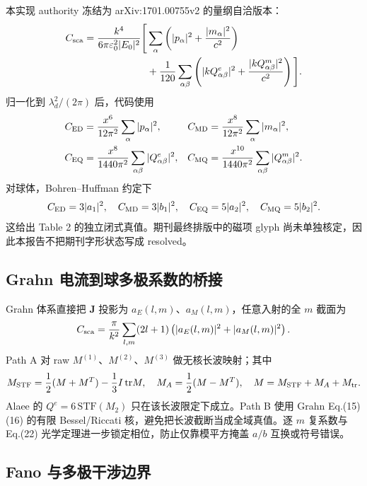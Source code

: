 本实现 authority 冻结为 arXiv:1701.00755v2 的量纲自洽版本：
\begin{equation}
\begin{aligned}
C_{\rm sca}=\frac{k^4}{6\pi\varepsilon_0^2|E_0|^2}\Bigg[&\sum_\alpha\left(|p_\alpha|^2+\frac{|m_\alpha|^2}{c^2}\right)\\
&+\frac{1}{120}\sum_{\alpha\beta}\left(|kQ^e_{\alpha\beta}|^2+\frac{|kQ^m_{\alpha\beta}|^2}{c^2}\right)\Bigg].
\end{aligned}
\label{eq:alaee1}
\end{equation}
归一化到 $\lambda_d^2/(2\pi)$ 后，代码使用
\begin{align}
C_{\rm ED}&=\frac{x^6}{12\pi^2}\sum_\alpha|p_\alpha|^2,&
C_{\rm MD}&=\frac{x^8}{12\pi^2}\sum_\alpha|m_\alpha|^2,\\
C_{\rm EQ}&=\frac{x^8}{1440\pi^2}\sum_{\alpha\beta}|Q^e_{\alpha\beta}|^2,&
C_{\rm MQ}&=\frac{x^{10}}{1440\pi^2}\sum_{\alpha\beta}|Q^m_{\alpha\beta}|^2.
\end{align}
对球体，Bohren--Huffman 约定下\cite{Bohren1983}
\begin{equation}
C_{\rm ED}=3|a_1|^2,\quad C_{\rm MD}=3|b_1|^2,\quad
C_{\rm EQ}=5|a_2|^2,\quad C_{\rm MQ}=5|b_2|^2.
\label{eq:miechannels}
\end{equation}
这给出 Table 2 的独立闭式真值。期刊最终排版中的磁项 glyph 尚未单独核定，因此本报告不把期刊字形状态写成 resolved。

\subsection{Grahn 电流到球多极系数的桥接}

Grahn 体系直接把 $\mathbf J$ 投影为 $a_E(l,m)$、$a_M(l,m)$\cite{Grahn2012}，任意入射的全 $m$ 截面为
\begin{equation}
C_{\rm sca}=\frac{\pi}{k^2}\sum_{l,m}(2l+1)\left(|a_E(l,m)|^2+|a_M(l,m)|^2\right).
\end{equation}
Path A 对 raw $M^{(1)}$、$M^{(2)}$、$M^{(3)}$ 做无核长波映射；其中
\begin{equation}
M_{\rm STF}=\frac12(M+M^T)-\frac13I\,\mathrm{tr}M,\quad
M_A=\frac12(M-M^T),\quad M=M_{\rm STF}+M_A+M_{\rm tr}.
\end{equation}
Alaee 的 $Q^e=6\,\mathrm{STF}(M_2)$ 只在该长波限定下成立。Path B 使用 Grahn Eq.(15)(16) 的有限 Bessel/Riccati 核，避免把长波截断当成全域真值。逐 $m$ 复系数与 Eq.(22) 光学定理进一步锁定相位，防止仅靠模平方掩盖 $a/b$ 互换或符号错误。

\subsection{Fano 与多极干涉边界}

